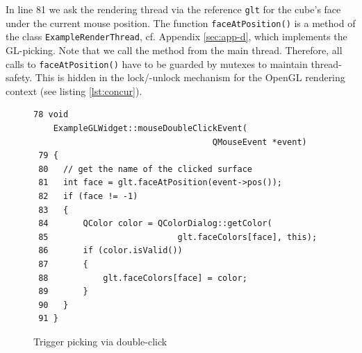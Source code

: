 \documentclass[jou,noapacite]{apa}
\begin{document}
In line 81 we ask the rendering thread via the reference \lstinline|glt| for the
cube's face under the current mouse position.
%
The function \lstinline|faceAtPosition()| is a method of the
class \lstinline|ExampleRenderThread|, cf. Appendix \ref{sec:app-d}, which implements the
GL-picking.
%
Note that we call the method from the main thread.
%
Therefore, all calls to \lstinline|faceAtPosition()| have to be guarded by
mutexes to maintain thread-safety.
%
This is hidden in the lock/-unlock mechanism for the OpenGL rendering context
(see listing \ref{lst:concur}).
\begin{figure}[h]
\begin{lstlisting}[basicstyle=\scriptsize]
 78 void
    ExampleGLWidget::mouseDoubleClickEvent(
                                    QMouseEvent *event)
 79 {
 80   // get the name of the clicked surface
 81   int face = glt.faceAtPosition(event->pos());
 82   if (face != -1)
 83   {
 84       QColor color = QColorDialog::getColor(
 85                          glt.faceColors[face], this);
 86       if (color.isValid())
 87       {
 88           glt.faceColors[face] = color;
 89       }
 90   }
 91 }
\end{lstlisting}
\caption{Trigger picking via double-click}
\label{lst:dclick}
\end{figure}
\end{document}

